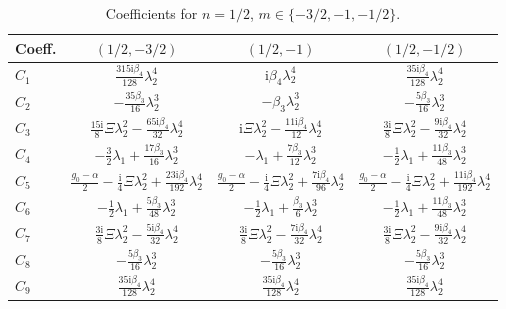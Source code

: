\documentclass[11pt]{article}
\newcommand{\ii}{\mathrm{i}}
\begin{document}
\begin{table}[htbp]
\centering\small
\caption{Coefficients for $n=1/2$, $m\in\{-3/2,-1,-1/2\}$.}
\begin{tabular}{lccc}
\toprule
Coeff. & $(1/2,-3/2)$ & $(1/2,-1)$ & $(1/2,-1/2)$ \\
\midrule
$C_1$ & $\tfrac{315\ii\beta_4}{128}\lambda_2^4$ & $\ii\beta_4\lambda_2^4$ & $\tfrac{35\ii\beta_4}{128}\lambda_2^4$ \\
$C_2$ & $-\tfrac{35\beta_3}{16}\lambda_2^3$ & $-\beta_3\lambda_2^3$ & $-\tfrac{5\beta_3}{16}\lambda_2^3$ \\
$C_3$ & $\tfrac{15\ii}{8}\Xi\lambda_2^2-\tfrac{65\ii\beta_4}{32}\lambda_2^4$ & $\ii\Xi\lambda_2^2-\tfrac{11\ii\beta_4}{12}\lambda_2^4$ & $\tfrac{3\ii}{8}\Xi\lambda_2^2-\tfrac{9\ii\beta_4}{32}\lambda_2^4$ \\
$C_4$ & $-\tfrac32\lambda_1+\tfrac{17\beta_3}{16}\lambda_2^3$ & $-\lambda_1+\tfrac{7\beta_3}{12}\lambda_2^3$ & $-\tfrac12\lambda_1+\tfrac{11\beta_3}{48}\lambda_2^3$ \\
$C_5$ & $\tfrac{g_0-\alpha}{2}-\tfrac{\ii}{4}\Xi\lambda_2^2+\tfrac{23\ii\beta_4}{192}\lambda_2^4$ & $\tfrac{g_0-\alpha}{2}-\tfrac{\ii}{4}\Xi\lambda_2^2+\tfrac{7\ii\beta_4}{96}\lambda_2^4$ & $\tfrac{g_0-\alpha}{2}-\tfrac{\ii}{4}\Xi\lambda_2^2+\tfrac{11\ii\beta_4}{192}\lambda_2^4$ \\
$C_6$ & $-\tfrac12\lambda_1+\tfrac{5\beta_3}{48}\lambda_2^3$ & $-\tfrac12\lambda_1+\tfrac{\beta_3}{6}\lambda_2^3$ & $-\tfrac12\lambda_1+\tfrac{11\beta_3}{48}\lambda_2^3$ \\
$C_7$ & $\tfrac{3\ii}{8}\Xi\lambda_2^2-\tfrac{5\ii\beta_4}{32}\lambda_2^4$ & $\tfrac{3\ii}{8}\Xi\lambda_2^2-\tfrac{7\ii\beta_4}{32}\lambda_2^4$ & $\tfrac{3\ii}{8}\Xi\lambda_2^2-\tfrac{9\ii\beta_4}{32}\lambda_2^4$ \\
$C_8$ & $-\tfrac{5\beta_3}{16}\lambda_2^3$ & $-\tfrac{5\beta_3}{16}\lambda_2^3$ & $-\tfrac{5\beta_3}{16}\lambda_2^3$ \\
$C_9$ & $\tfrac{35\ii\beta_4}{128}\lambda_2^4$ & $\tfrac{35\ii\beta_4}{128}\lambda_2^4$ & $\tfrac{35\ii\beta_4}{128}\lambda_2^4$ \\
\bottomrule
\end{tabular}
\end{table}
\end{document}
